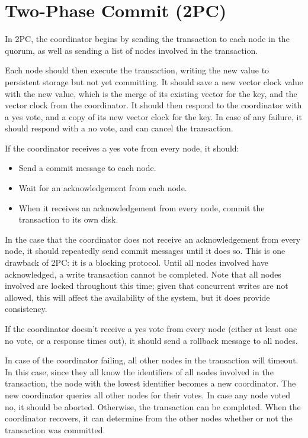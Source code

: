 \documentclass[12pt,a4paper,twoside,openright]{report}
\begin{document}
\section{Two-Phase Commit (2PC)}

In 2PC, the coordinator begins by sending the transaction to each node in the quorum, as well as sending a list of nodes involved in the transaction.

Each node should then execute the transaction, writing the new value to persistent storage but not yet committing. It should save a new vector clock value with the new value, which is the merge of its existing vector for the key, and the vector clock from the coordinator. It should then respond to the coordinator with a yes vote, and a copy of its new vector clock for the key. In case of any failure, it should respond with a no vote, and can cancel the transaction.

If the coordinator receives a yes vote from every node, it should:

\begin{itemize}
  \item
  Send a commit message to each node.

  \item
  Wait for an acknowledgement from each node.

  \item
  When it receives an acknowledgement from every node, commit the transaction to its own disk.

\end{itemize}

In the case that the coordinator does not receive an acknowledgement from every node, it should repeatedly send commit messages until it does so. This is one drawback of 2PC: it is a blocking protocol. Until all nodes involved have acknowledged, a write transaction cannot be completed. Note that all nodes involved are locked throughout this time; given that concurrent writes are not allowed, this will affect the availability of the system, but it does provide consistency.

If the coordinator doesn't receive a yes vote from every node (either at least one no vote, or a response times out), it should send a rollback message to all nodes.

In case of the coordinator failing, all other nodes in the transaction will timeout. In this case, since they all know the identifiers of all nodes involved in the transaction, the node with the lowest identifier becomes a new coordinator. The new coordinator queries all other nodes for their votes. In case any node voted no, it should be aborted. Otherwise, the transaction can be completed. When the coordinator recovers, it can determine from the other nodes whether or not the transaction was committed.
\end{document}
